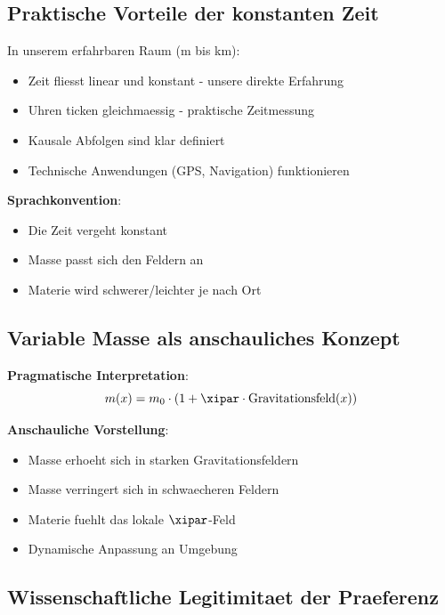 	\subsection{Praktische Vorteile der konstanten Zeit}
	
	In unserem erfahrbaren Raum (m bis km):
	\begin{itemize}
		\item Zeit fliesst linear und konstant - unsere direkte Erfahrung
		\item Uhren ticken gleichmaessig - praktische Zeitmessung
		\item Kausale Abfolgen sind klar definiert
		\item Technische Anwendungen (GPS, Navigation) funktionieren
	\end{itemize}
	
	\textbf{Sprachkonvention}:
	\begin{itemize}
		\item Die Zeit vergeht konstant
		\item Masse passt sich den Feldern an
		\item Materie wird schwerer/leichter je nach Ort
	\end{itemize}
	
	\subsection{Variable Masse als anschauliches Konzept}
	
	\textbf{Pragmatische Interpretation}:
	\begin{equation}
		m(x) = m_0 \cdot (1 + \xipar \cdot \text{Gravitationsfeld}(x))
	\end{equation}
	
	\textbf{Anschauliche Vorstellung}:
	\begin{itemize}
		\item Masse erhoeht sich in starken Gravitationsfeldern
		\item Masse verringert sich in schwaecheren Feldern
		\item Materie fuehlt das lokale $\xipar$-Feld
		\item Dynamische Anpassung an Umgebung
	\end{itemize}
	
	\subsection{Wissenschaftliche Legitimitaet der Praeferenz}
	

